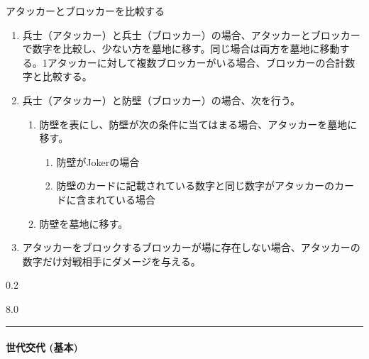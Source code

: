 \documentclass[letterpaper,10pt,dvipdfmx]{sphinxmanual}
\begin{document}
\sphinxAtStartPar
アタッカーとブロッカーを比較する
\begin{enumerate}
%
\item {} 
\sphinxAtStartPar
兵士（アタッカー）と兵士（ブロッカー）の場合、アタッカーとブロッカーで数字を比較し、少ない方を墓地に移す。同じ場合は両方を墓地に移動する。1アタッカーに対して複数ブロッカーがいる場合、ブロッカーの合計数字と比較する。

\item {} 
\sphinxAtStartPar
兵士（アタッカー）と防壁（ブロッカー）の場合、次を行う。
\begin{enumerate}
%
\item {} 
\sphinxAtStartPar
防壁を表にし、防壁が次の条件に当てはまる場合、アタッカーを墓地に移す。
\begin{enumerate}
%
\item {} 
\sphinxAtStartPar
防壁がJokerの場合

\item {} 
\sphinxAtStartPar
防壁のカードに記載されている数字と同じ数字がアタッカーのカードに含まれている場合

\end{enumerate}

\item {} 
\sphinxAtStartPar
防壁を墓地に移す。

\end{enumerate}

\item {} 
\sphinxAtStartPar
アタッカーをブロックするブロッカーが場に存在しない場合、アタッカーの数字だけ対戦相手にダメージを与える。

\end{enumerate}

\sphinxAtStartPar
{}  0.2

\sphinxAtStartPar
{}  8.0


\bigskip\hrule\bigskip



\paragraph{世代交代 (基本)}
\label{\detokenize{auto/actionlist:act-nextgeneration}}\label{\detokenize{auto/actionlist:id10}}
\sphinxAtStartPar
{}
\end{document}
